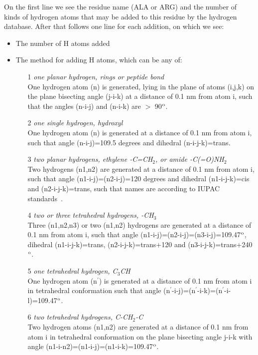 On the first line we see the residue name (ALA or ARG) and the number
of kinds of hydrogen atoms that may be added to this residue by the
hydrogen database. After that follows one line for each addition, on which
we see:
\begin{itemize}
\item The number of H atoms added
\item The method for adding H atoms, which can be any of:
\begin{enumerate}
\item[1]{\em one planar hydrogen, {\eg} rings or peptide bond}\\
One hydrogen atom (n) is generated, lying in the plane of atoms
(i,j,k) on the plane bisecting angle (j-i-k) at a distance of 0.1 nm
from atom i, such that the angles (n-i-j) and (n-i-k) are $>$ 90$^{\rm o}$.

\item[2]{\em one single hydrogen, {\eg} hydroxyl}\\
One hydrogen atom (n) is generated at a distance of 0.1 nm from atom
i, such that angle (n-i-j)=109.5 degrees and dihedral (n-i-j-k)=trans.

\item[3]{\em two planar hydrogens, {\eg} ethylene -C=CH{$_2$}, or amide -C(=O)NH{$_2$}}\\
Two hydrogens (n1,n2) are generated at a distance of 0.1 nm from atom
i, such that angle (n1-i-j)=(n2-i-j)=120 degrees and dihedral
(n1-i-j-k)=cis and (n2-i-j-k)=trans, such that names are according to
IUPAC standards~\cite{iupac70}.

\item[4]{\em two or three tetrahedral hydrogens, {\eg} -CH{$_3$}}\\
Three (n1,n2,n3) or two (n1,n2) hydrogens are generated at a distance
of 0.1 nm from atom i, such that angle
(n1-i-j)=(n2-i-j)=(n3-i-j)=109.47$^{\rm o}$, dihedral (n1-i-j-k)=trans,
(n2-i-j-k)=trans+120 and (n3-i-j-k)=trans+240$^{\rm o}$.

\item[5]{\em one tetrahedral hydrogen, {\eg} C{$_3$}CH}\\
One hydrogen atom (n$^\prime$) is generated at a distance of 0.1 nm from atom
i in tetrahedral conformation such that angle
(n$^\prime$-i-j)=(n$^\prime$-i-k)=(n$^\prime$-i-l)=109.47$^{\rm o}$.

\item[6]{\em two tetrahedral hydrogens, {\eg} C-CH{$_2$}-C}\\
Two hydrogen atoms (n1,n2) are generated at a distance of 0.1 nm from
atom i in tetrahedral conformation on the plane bisecting angle j-i-k
with angle (n1-i-n2)=(n1-i-j)=(n1-i-k)=109.47$^{\rm o}$.


\end{enumerate}
\end{itemize}

